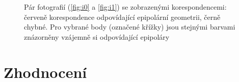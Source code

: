 \documentclass[11pt,oneside,a4paper,pdftex]{article}   %
\begin{document}
	\begin{figure}[htb]
			\centering
		\caption{Pár fotografií (\ref{fig:i0} a \ref{fig:i1}) se zobrazenými korespondencemi: červeně korespondence odpovídající
			epipolární geometrii, černě chybné. Pro vybrané body (označené křížky) jsou stejnými barvami znázorněny vzájemně si
			odpovídající epipoláry}
		\label{fig:pairWithEpipolars}
	\end{figure}

\section{Zhodnocení}




%


\end{document}
